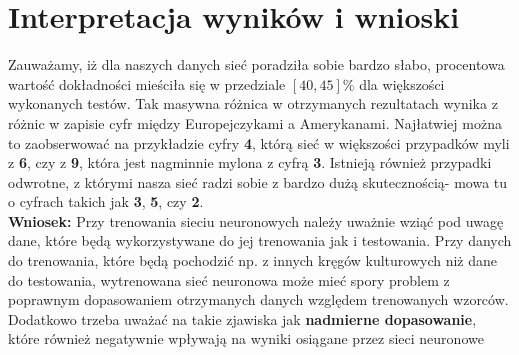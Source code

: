 \documentclass[a4paper,14pt]{report}
\begin{document}
\section{Interpretacja wyników i wnioski}
	Zauważamy, iż dla naszych danych sieć poradziła sobie bardzo słabo, procentowa wartość dokładności mieściła się w przedziale $[40,45]\%$ dla większości wykonanych testów. Tak masywna różnica w otrzymanych rezultatach wynika z różnic w zapisie cyfr między Europejczykami a Amerykanami. Najłatwiej można to zaobserwować na przykładzie cyfry \textbf{4}, którą sieć w większości przypadków myli z \textbf{6}, czy z \textbf{9}, która jest nagminnie mylona z cyfrą \textbf{3}. Istnieją również przypadki odwrotne, z którymi nasza sieć radzi sobie z bardzo dużą skutecznością- mowa tu o cyfrach takich jak \textbf{3}, \textbf{5}, czy \textbf{2}. \\
	\textbf{Wniosek:} Przy trenowania sieciu neuronowych należy uważnie wziąć pod uwagę dane, które będą wykorzystywane do jej trenowania jak i testowania. Przy danych do trenowania, które będą pochodzić np. z innych kręgów kulturowych niż dane do testowania, wytrenowana sieć neuronowa może mieć spory problem z poprawnym dopasowaniem otrzymanych danych względem trenowanych wzorców. Dodatkowo trzeba uważać na takie zjawiska jak \textbf{nadmierne dopasowanie}, które również negatywnie wpływają na wyniki osiągane przez sieci neuronowe
\end{document}
